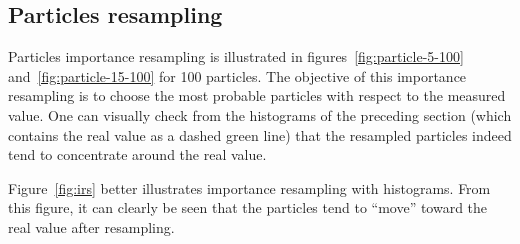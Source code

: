 \documentclass[english, DIV=13]{scrartcl}
\begin{document}
\subsection{Particles resampling}
Particles importance resampling is illustrated in figures~\ref{fig:particle-5-100}
and~\ref{fig:particle-15-100} for 100 particles. The objective of this importance
resampling is to choose the most probable particles with respect to the measured
value. One can visually check from the histograms of the preceding section (which
contains the real value as a dashed green line) that the resampled particles indeed tend
to concentrate around the real value.

Figure~\ref{fig:irs} better illustrates importance resampling with histograms. From this
figure, it can clearly be seen that the particles tend to ``move'' toward the real value after
resampling.
\end{document}
